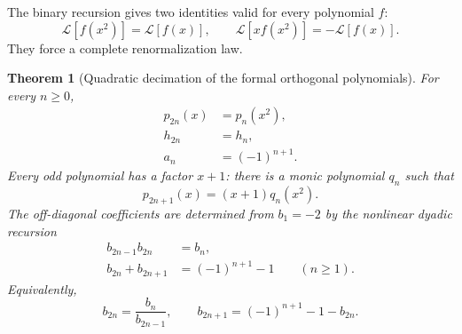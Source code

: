 \documentclass[11pt]{article}
\newtheorem{theorem}{Theorem}[section]
\theoremstyle{definition}
\theoremstyle{remark}
\newcommand{\cL}{\mathcal L}
\begin{document}
The binary recursion gives two identities valid for every polynomial \(f\):
\begin{equation}
 \cL[f(x^2)]=\cL[f(x)],
 \qquad
 \cL[xf(x^2)]=-\cL[f(x)].                    \label{p6:eq:L-quadratic}
\end{equation}
They force a complete renormalization law.

\begin{theorem}[Quadratic decimation of the formal orthogonal polynomials]
\label{p6:thm:tm-quadratic-op}
For every \(n\ge0\),
\begin{align}
 p_{2n}(x)&=p_n(x^2),                                      \label{p6:eq:p-even-decimation}\\
 h_{2n}&=h_n,                                              \label{p6:eq:h-even-decimation}\\
 a_n&=(-1)^{n+1}.                                          \label{p6:eq:a-alternating}
\end{align}
Every odd polynomial has a factor \(x+1\): there is a monic polynomial \(q_n\) such that
\begin{equation}
 p_{2n+1}(x)=(x+1)q_n(x^2).                                \label{p6:eq:p-odd-factor}
\end{equation}
The off-diagonal coefficients are determined from \(b_1=-2\) by the nonlinear dyadic
recursion
\begin{align}
 b_{2n-1}b_{2n}&=b_n,                                      \label{p6:eq:b-product-rec}\\
 b_{2n}+b_{2n+1}&=(-1)^{n+1}-1\qquad(n\ge1).               \label{p6:eq:b-sum-rec}
\end{align}
Equivalently,
\begin{equation}
 b_{2n}=\frac{b_n}{b_{2n-1}},
 \qquad
 b_{2n+1}=(-1)^{n+1}-1-b_{2n}.                             \label{p6:eq:b-explicit-rec}
\end{equation}
\end{theorem}
\end{document}
